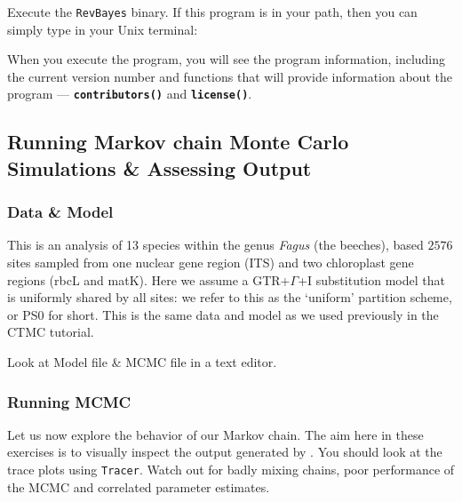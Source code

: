 \documentclass[11pt]{article}
\newcommand{\cl}[1]{{\texttt{\textbf{#1}}}}
\begin{document}
Execute the \verb!RevBayes! binary. 
If this program is in your path, then you can simply type in your Unix terminal:

\exs{\cl{\$ rb}}

When you execute the program, you will see the program information, including the current version number and functions that will provide information about the program --- \cl{contributors()} and \cl{license()}. 




\bigskip
\subsection{Running Markov chain Monte Carlo Simulations \& Assessing Output}\label{secUnif} 


\subsubsection{Data \& Model}

This is an analysis of 13 species within the genus \emph{Fagus} (the beeches), based 
$2576$ sites sampled from one nuclear gene region (ITS) and two chloroplast gene regions
(rbcL and matK).
Here we assume a GTR+$\Gamma$+I substitution model that is uniformly shared by all sites:
we refer to this as the `uniform' partition scheme, or PS0 for short.
This is the same data and model as we used previously in the CTMC tutorial.

Look at Model file \& MCMC file in a text editor.


\subsubsection{Running MCMC}

Let us now explore the behavior of our Markov chain.
The aim here in these exercises is to visually inspect the output generated by \RevBayes.
You should look at the trace plots using \verb!Tracer!.
Watch out for badly mixing chains, poor performance of the MCMC and correlated parameter estimates.
\end{document}
